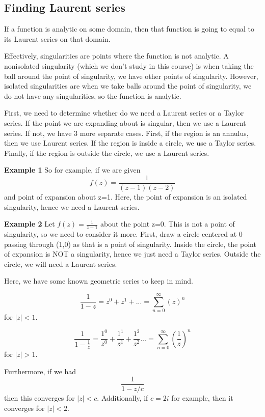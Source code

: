 \documentclass[twoside]{article}
\begin{document}
\subsection{Finding Laurent series}

If a function is analytic on some domain, then that function is going to equal to its Laurent series on that domain.

Effectively, singularities are points where the function is not analytic. A nonisolated singularity (which we don't study in this course) is when taking the ball around the point of singularity, we have other points of singularity. However, isolated singularities are when we take balls around the point of singularity, we do not have any singularities, so the function is analytic.

First, we need to determine whether do we need a Laurent series or a Taylor series. If the point we are expanding about is singular, then we use a Laurent series. If not, we have 3 more separate cases. First, if the region is an annulus, then we use  Laurent series. If the region is inside a circle, we use a Taylor series. Finally, if the region is outside the circle, we use a Laurent series.

\bigskip

\textbf{Example 1}
So for example, if we are given $$f(z) = \frac{1}{(z-1)(z-2)}$$ and point of expansion about z=1. Here, the point of expansion is an isolated singularity, hence we need a Laurent series.

\bigskip

\textbf{Example 2}
Let $f(z) = \frac{1}{z - 1}$ about the point z=0. This is not a point of singularity, so we need to consider it more. First, draw a circle centered at 0 passing through (1,0) as that is a point of singularity. Inside the circle, the point of expansion is NOT a singularity, hence we just need a Taylor series. Outside the circle, we will need a Laurent series.

\bigskip

Here, we have some known geometric series to keep in mind. 

$$
\frac{1}{1 - z} = z^0 + z^1 + ... = \sum_{n=0}^{\infty}(z)^n
$$
for $|z| < 1$.

$$
\frac{1}{1 - \frac{1}{z}} = \frac{1^0}{z^0} + \frac{1^1}{z^1} + \frac{1^2}{z^2}... = \sum_{n=0}^{\infty}(\frac{1}{z})^n
$$
for $|z| > 1$.

Furthermore, if we had 
$$
\frac{1}{1 - z/c}
$$
then this converges for $|z| < c$. Additionally, if $c = 2i$ for example, then it converges for $|z| < 2$.
\end{document}
